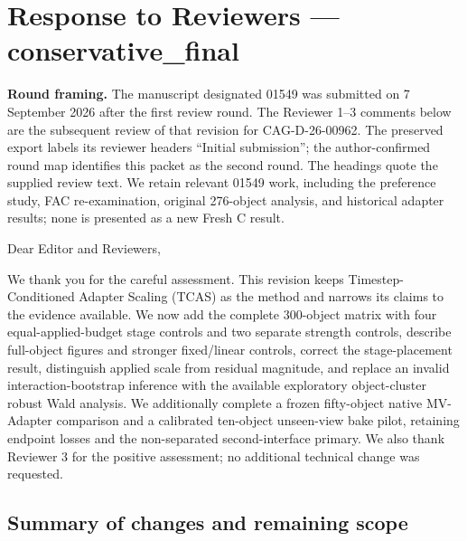 \documentclass[
  10pt,
]{article}
\author{}
\date{}
\begin{document}
\hypertarget{response-to-reviewers-conservative_visuals}{%
\section{Response to Reviewers ---
conservative\_final}\label{response-to-reviewers-conservative_visuals}}

\textbf{Round framing.} The manuscript designated 01549 was submitted on
7 September 2026 after the first review round. The Reviewer 1--3
comments below are the subsequent review of that revision for
CAG-D-26-00962. The preserved export labels its reviewer headers
``Initial submission''; the author-confirmed round map identifies this
packet as the second round. The headings quote the supplied review text.
We retain relevant 01549 work, including the preference study, FAC
re-examination, original 276-object analysis, and historical adapter
results; none is presented as a new Fresh C result.

Dear Editor and Reviewers,

We thank you for the careful assessment. This revision keeps
Timestep-Conditioned Adapter Scaling (TCAS) as the method and narrows
its claims to the evidence available. We now add the complete 300-object
matrix with four equal-applied-budget stage controls and two separate
strength controls, describe full-object figures and stronger
fixed/linear controls, correct the stage-placement result, distinguish
applied scale from residual magnitude, and replace an invalid
interaction-bootstrap inference with the available exploratory
object-cluster robust Wald analysis. We additionally complete a frozen
fifty-object native MV-Adapter comparison and a calibrated ten-object
unseen-view bake pilot, retaining endpoint losses and the non-separated
second-interface primary. We also thank Reviewer 3 for the positive
assessment; no additional technical change was requested.

\hypertarget{summary-of-changes-and-remaining-scope}{%
\subsection{Summary of changes and remaining
scope}\label{summary-of-changes-and-remaining-scope}}
\end{document}
